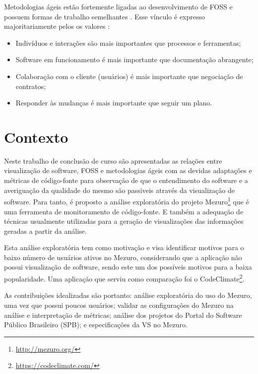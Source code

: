 Metodologias ágeis estão fortemente ligadas ao desenvolvimento de FOSS e
possuem formas de trabalho semelhantes \cite{meirelles2013monitoramento}. Esse
vínculo é expresso majoritariamente pelos os valores \cite{beck2001manifesto}:

\begin{itemize}
  \item Indivíduos e interações são mais importantes que processos e
  ferramentas;
  \item Software em funcionamento é mais importante que documentação abrangente;
  \item Colaboração com o cliente (usuários) é mais importante que negociação
  de contratos;
  \item Responder às mudanças é mais importante que seguir um plano.
\end{itemize}


\section{Contexto}

Neste trabalho de conclusão de curso são apresentadas as relações entre
visualização de software, FOSS e metodologias ágeis com as devidas adaptações e
métricas de código-fonte para observação de que o entendimento do software e a
averiguação da qualidade do mesmo são passiveis através da visualização de
software. Para tanto, é proposto a análise exploratória do projeto
Mezuro\footnote{\url{http://mezuro.org/}} que é uma ferramenta de monitoramento
de código-fonte. E também a adequação de técnicas usualmente utilizadas
para a geração de visualizações das informações geradas a partir da análise.

Esta análise exploratória tem como motivação e visa identificar motivos para o
baixo número de usuários ativos no Mezuro, considerando que a aplicação não
possui visualização de software, sendo este um dos possíveis motivos para a
baixa popularidade. Uma aplicação que serviu como comparação foi o
CodeClimate\footnote{\url{https://codeclimate.com/}}.

As contribuições idealizadas são portanto: análise exploratória do uso do Mezuro,
uma vez que possui poucos usuários; validar as configurações do Mezuro na
análise e interpretação de métricas; análise dos projetos do Portal do Software
Público Brasileiro (SPB); e especificações da VS no Mezuro.

